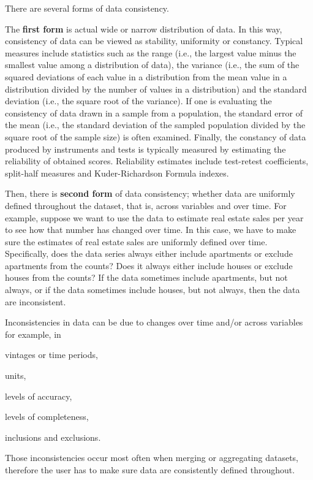 There are several forms of data consistency.

The \textbf{first form} is actual wide or narrow distribution of data.
In this way, consistency of data can be viewed as stability, uniformity or constancy.
Typical measures include statistics such as the range (i.e., the largest value minus the smallest value among a distribution of data), the variance (i.e., the sum of the squared deviations of each value in a distribution from the mean value in a distribution divided by the number of values in a distribution) and the standard deviation (i.e., the square root of the variance).
If one is evaluating the consistency of data drawn in a sample from a population, the standard error of the mean (i.e., the standard deviation of the sampled population divided by the square root of the sample size) is often examined.
Finally, the constancy of data produced by instruments and tests is typically measured by estimating the reliability of obtained scores.
Reliability estimates include test-retest coefficients, split-half measures and Kuder-Richardson Formula  indexes.

Then, there is \textbf{second form} of data consistency; whether data are uniformly defined throughout the dataset, that is, across variables and over time.
For example, suppose we want to use the data to estimate real estate sales per year to see how that number has changed over time.
In this case, we have to make sure the estimates of real estate sales are uniformly defined over time.
Specifically, does the data series always either include apartments or exclude apartments from the counts?
Does it always either include houses or exclude houses from the counts?
If the data sometimes include apartments, but not always, or if the data sometimes include houses, but not always, then the data are inconsistent.

Inconsistencies in data can be due to changes over time and/or across variables for example, in
\begin{enumerate*}[label=(\roman*)]
    \item vintages or time periods,
    \item units,
    \item levels of accuracy,
    \item levels of completeness,
    \item inclusions and exclusions.
\end{enumerate*}
Those inconsistencies occur most often when merging or aggregating datasets, therefore the user has to make sure data are consistently defined throughout.